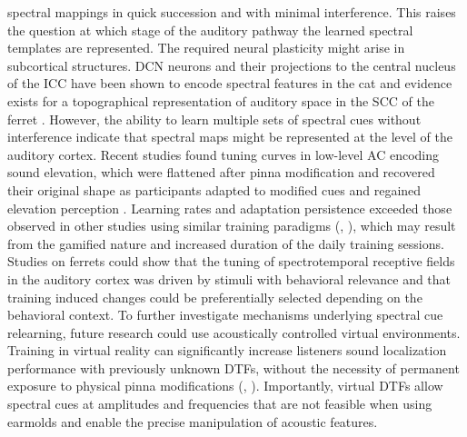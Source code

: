 spectral mappings in quick succession and with minimal interference. This raises the question at which stage of the auditory pathway the learned spectral templates are represented. The required neural plasticity might arise in subcortical structures. DCN neurons and their projections to the central nucleus of the ICC have been shown to encode spectral features in the cat \citep{davis_auditory_2003} and evidence exists for a topographical representation of auditory space in the SCC of the ferret \citep{king_spatial_1987}. However, the ability to learn multiple sets of spectral cues without interference indicate that spectral maps might be represented at the level of the auditory cortex. Recent studies found tuning curves in low-level AC encoding sound elevation, which were flattened after pinna modification and recovered their original shape as participants adapted to modified cues and regained elevation perception \citep{trapeau_encoding_2018}. Learning rates and adaptation persistence exceeded those observed in other studies using similar training paradigms (\citet{parseihian_rapid_2012}, \citet{trapeau_fast_2016}), which may result from the gamified nature and increased duration of the daily training sessions. Studies on ferrets could show that the tuning of spectrotemporal receptive fields in the auditory cortex was driven by stimuli with behavioral relevance and that training induced changes could be preferentially selected depending on the behavioral context. To further investigate mechanisms underlying spectral cue relearning, future research could use acoustically controlled virtual environments. Training in virtual reality can significantly increase listeners sound localization performance with previously unknown DTFs, without the necessity of permanent exposure to physical pinna modifications (\citet{honda_transfer_2007}, \citet{steadman_short-term_2019}). Importantly, virtual DTFs allow spectral cues at amplitudes and frequencies that are not feasible when using earmolds and enable the precise manipulation of acoustic features.